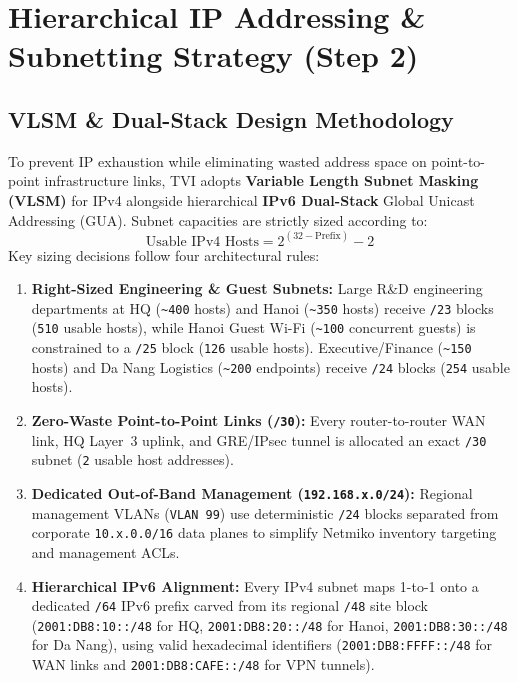 \section{Hierarchical IP Addressing \& Subnetting Strategy (Step 2)}

\subsection{VLSM \& Dual-Stack Design Methodology}
To prevent IP exhaustion while eliminating wasted address space on point-to-point infrastructure links, TVI adopts \textbf{Variable Length Subnet Masking (VLSM)} for IPv4 alongside hierarchical \textbf{IPv6 Dual-Stack} Global Unicast Addressing (GUA). Subnet capacities are strictly sized according to:
\[
    \text{Usable IPv4 Hosts} = 2^{(32 - \text{Prefix})} - 2
\]
Key sizing decisions follow four architectural rules:
\begin{enumerate}[leftmargin=1.5em, itemsep=2pt]
    \item \textbf{Right-Sized Engineering \& Guest Subnets:} Large R\&D engineering departments at HQ (\texttt{\textasciitilde 400} hosts) and Hanoi (\texttt{\textasciitilde 350} hosts) receive \texttt{/23} blocks (\texttt{510} usable hosts), while Hanoi Guest Wi-Fi (\texttt{\textasciitilde 100} concurrent guests) is constrained to a \texttt{/25} block (\texttt{126} usable hosts). Executive/Finance (\texttt{\textasciitilde 150} hosts) and Da Nang Logistics (\texttt{\textasciitilde 200} endpoints) receive \texttt{/24} blocks (\texttt{254} usable hosts).
    \item \textbf{Zero-Waste Point-to-Point Links (\texttt{/30}):} Every router-to-router WAN link, HQ Layer~3 uplink, and GRE/IPsec tunnel is allocated an exact \texttt{/30} subnet (\texttt{2} usable host addresses).
    \item \textbf{Dedicated Out-of-Band Management (\texttt{192.168.x.0/24}):} Regional management VLANs (\texttt{VLAN 99}) use deterministic \texttt{/24} blocks separated from corporate \texttt{10.x.0.0/16} data planes to simplify Netmiko inventory targeting and management ACLs.
    \item \textbf{Hierarchical IPv6 Alignment:} Every IPv4 subnet maps 1-to-1 onto a dedicated \texttt{/64} IPv6 prefix carved from its regional \texttt{/48} site block (\texttt{2001:DB8:10::/48} for HQ, \texttt{2001:DB8:20::/48} for Hanoi, \texttt{2001:DB8:30::/48} for Da Nang), using valid hexadecimal identifiers (\texttt{2001:DB8:FFFF::/48} for WAN links and \texttt{2001:DB8:CAFE::/48} for VPN tunnels).
\end{enumerate}

